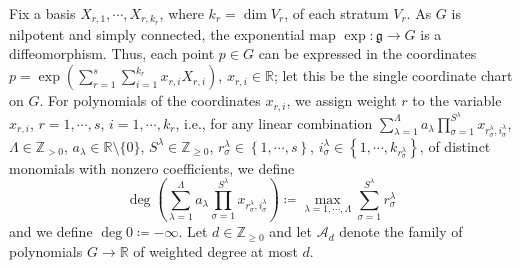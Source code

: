 \documentclass[11pt,reqno]{amsart}
\newcommand{\1}{\mathbf 1}
\begin{document}
Fix a basis $X_{r,1},\cdots, X_{r,k_r}$, where $k_r=\dim V_r$, of each stratum $V_r$. As $G$ is nilpotent and simply connected, the exponential map $\exp:\mathfrak{g}\to G$ is a diffeomorphism. Thus, each point $p\in G$ can be expressed in the coordinates $p=\exp\left(\sum_{r=1}^s\sum_{i=1}^{k_r}x_{r,i}X_{r,i}\right)$, $x_{r,i}\in \mathbb{R}$; let this be the single coordinate chart on $G$. For polynomials of the coordinates $x_{r,i}$, we assign weight $r$ to the variable $x_{r,i}$, $r=1,\cdots,s$, $i=1,\cdots,k_r$, i.e., for any linear combination $\sum_{\lambda=1}^\Lambda a_\lambda \prod_{\sigma=1}^{S^\lambda} x_{r^\lambda_\sigma,i^\lambda_\sigma}$, $\Lambda\in \mathbb{Z}_{>0}$, $a_\lambda\in \mathbb{R}\setminus\{0\}$, $S^\lambda\in \mathbb{Z}_{\ge 0}$, $r^\lambda_\sigma\in \left\{1,\cdots,s\right\}$, $i^\lambda_\sigma\in \left\{1,\cdots,k_{r^\lambda_\sigma}\right\}$, of distinct monomials with nonzero coefficients, we define
\[
\deg\left(\sum_{\lambda=1}^\Lambda a_\lambda \prod_{\sigma=1}^{S^\lambda} x_{r^\lambda_\sigma,i^\lambda_\sigma}\right)\coloneqq\max_{\lambda=1,\cdots,\Lambda}\sum_{\sigma=1}^{S^\lambda}r^\lambda_\sigma
\]
and we define $\deg 0\coloneqq -\infty$. Let $d\in \mathbb{Z}_{\ge 0}$ and let $\mathcal{A}_d$ denote the family of polynomials $G\to\mathbb{R}$ of weighted degree at most $d$.
\end{document}
